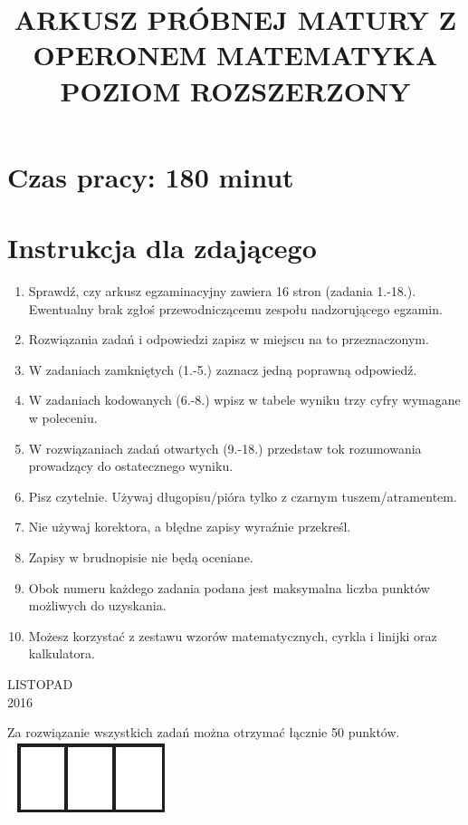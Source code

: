 \documentclass[10pt]{article}
\title{ARKUSZ PRÓBNEJ MATURY Z OPERONEM MATEMATYKA \\
 POZIOM ROZSZERZONY }
\author{}
\date{}
\begin{document}
\maketitle
\section*{Czas pracy: 180 minut}
\section*{Instrukcja dla zdającego}
\begin{enumerate}
  \item Sprawdź, czy arkusz egzaminacyjny zawiera 16 stron (zadania 1.-18.). Ewentualny brak zgłoś przewodniczącemu zespołu nadzorującego egzamin.
  \item Rozwiązania zadań i odpowiedzi zapisz w miejscu na to przeznaczonym.
  \item W zadaniach zamkniętych (1.-5.) zaznacz jedną poprawną odpowiedź.
  \item W zadaniach kodowanych (6.-8.) wpisz w tabele wyniku trzy cyfry wymagane w poleceniu.
  \item W rozwiązaniach zadań otwartych (9.-18.) przedstaw tok rozumowania prowadzący do ostatecznego wyniku.
  \item Pisz czytelnie. Używaj długopisu/pióra tylko z czarnym tuszem/atramentem.
  \item Nie używaj korektora, a błędne zapisy wyraźnie przekreśl.
  \item Zapisy w brudnopisie nie będą oceniane.
  \item Obok numeru każdego zadania podana jest maksymalna liczba punktów możliwych do uzyskania.
  \item Możesz korzystać z zestawu wzorów matematycznych, cyrkla i linijki oraz kalkulatora.
\end{enumerate}

LISTOPAD\\
2016

Za rozwiązanie wszystkich zadań można otrzymać łącznie 50 punktów.\\
\includegraphics[max width=\textwidth, center]{2024_11_21_c0ca116654784d42326bg-01}
\end{document}
